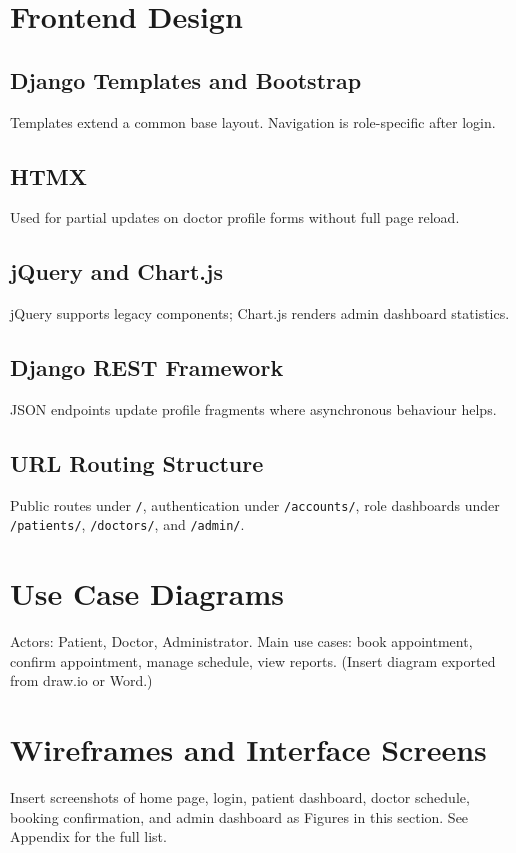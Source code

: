 \section{Frontend Design}

\subsection{Django Templates and Bootstrap}
Templates extend a common base layout. Navigation is role-specific after login.

\subsection{HTMX}
Used for partial updates on doctor profile forms without full page reload.

\subsection{jQuery and Chart.js}
jQuery supports legacy components; Chart.js renders admin dashboard statistics.

\subsection{Django REST Framework}
JSON endpoints update profile fragments where asynchronous behaviour helps.

\subsection{URL Routing Structure}
Public routes under \texttt{/}, authentication under \texttt{/accounts/}, role dashboards under \texttt{/patients/}, \texttt{/doctors/}, and \texttt{/admin/}.

\section{Use Case Diagrams}

Actors: Patient, Doctor, Administrator. Main use cases: book appointment, confirm appointment, manage schedule, view reports. (Insert diagram exported from draw.io or Word.)

\section{Wireframes and Interface Screens}

Insert screenshots of home page, login, patient dashboard, doctor schedule, booking confirmation, and admin dashboard as Figures in this section. See Appendix for the full list.

